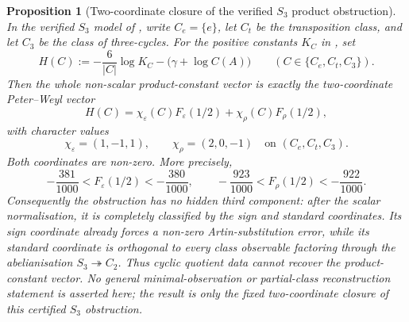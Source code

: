 \documentclass[11pt,a4paper]{amsart}
\theoremstyle{plain}
\newtheorem{proposition}[theorem]{Proposition}
\theoremstyle{definition}
\theoremstyle{remark}
\begin{document}
\begin{proposition}[Two-coordinate closure of the verified \(S_3\)
  product obstruction]
  \label{prop:s3-two-coordinate-product-obstruction-vector}
  \label{prop:s3-two-coordinate-product-obstruction-factorisation}
  In the verified \(S_3\) model of
  , write
  \(C_e=\{e\}\), let \(C_t\) be the transposition class, and let
  \(C_3\) be the class of three-cycles.  For the positive constants
  \(K_C\) in , set
  \[
    H(C):=-\frac{6}{|C|}\log K_C-\bigl(\gamma+\log C(A)\bigr)
    \qquad(C\in\{C_e,C_t,C_3\}).
  \]
  Then the whole non-scalar product-constant vector is exactly the
  two-coordinate Peter--Weyl vector
  \begin{equation}\label{eq:s3-product-obstruction-vector}
    H(C)=\chi_\varepsilon(C)F_\varepsilon(1/2)
      +\chi_\rho(C)F_\rho(1/2),
  \end{equation}
  with character values
  \[
    \chi_\varepsilon=(1,-1,1),
    \qquad
    \chi_\rho=(2,0,-1)
    \quad\text{on }(C_e,C_t,C_3).
  \]
  Both coordinates are non-zero.  More precisely,
  \[
    -\frac{381}{1000}<F_\varepsilon(1/2)<-\frac{380}{1000},
    \qquad
    -\frac{923}{1000}<F_\rho(1/2)<-\frac{922}{1000}.
  \]
  Consequently the obstruction has no hidden third component: after the
  scalar normalisation, it is completely classified by the sign and
  standard coordinates.  Its sign coordinate already forces a non-zero
  Artin-substitution error, while its standard coordinate is orthogonal to
  every class observable factoring through the abelianisation
  \(S_3\twoheadrightarrow C_2\).  Thus cyclic quotient data cannot recover
  the product-constant vector.  No general minimal-observation or partial-class
  reconstruction statement is asserted here; the result is only the fixed
  two-coordinate closure of this certified \(S_3\) obstruction.
\end{proposition}
\end{document}
